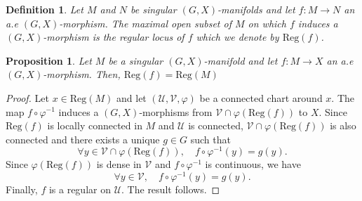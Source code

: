 \documentclass[a4paper,12pt]{article}
\newtheorem{prop}[lem]{Proposition}
\newtheorem{defi}[lem]{Definition}    %
\def\U{\mathcal U}
\def\V{\mathcal V}
\def\Reg{\mathrm{Reg}}
\def\reg{\Reg}
\def\V{\mathcal V}
\def\reg{\mathrm{Reg}}
\def\U{\mathcal{U}}
\def\Reg{\mathrm{Reg}}
\begin{document}
                \begin{defi}\label{def:singular_manifolds_morphism_maximal} Let $M$ and $N$ be singular $(G,X)$-manifolds and let $f:M\rightarrow N$ an a.e $(G,X)$-morphism.
                The maximal open subset of $M$ on which $f$ induces a $(G,X)$-morphism is the regular locus of $f$ which we denote by $\reg(f)$.
                \end{defi}

                    \begin{prop}\label{prop:singular_manifold_morphism}
                     Let $M$ be a singular $(G,X)$-manifold and let $f:M\rightarrow X$ an a.e $(G,X)$-morphism. Then, 
                     $\reg(f)=\reg(M)$
                    \end{prop}
                    \begin{proof}
                     Let $x\in \reg(M)$ and let $(\U,\V,\varphi)$ be a connected chart around $x$. The map $f\circ\varphi^{-1}$ induces a $(G,X)$-morphisms from $\V\cap \varphi(\reg(f))$ to $X$. Since $\reg(f)$ is locally connected in $M$ and $\U$ is connected, $\V\cap \varphi(\reg(f))$ is also connected and there exists a unique $g\in G$ such that $$\forall y\in \V\cap \varphi(\reg(f)),\quad  f\circ \varphi^{-1}(y)=g(y).$$
                     Since $\varphi(\Reg(f))$ is dense in $\V$ and $f\circ \varphi^{-1}$ is continuous, we have
                     $$\forall y\in \V,\quad  f\circ \varphi^{-1}(y)=g(y).$$
                     Finally, $f$ is a regular on $\U$. The result follows.
                    \end{proof}
\end{document}
